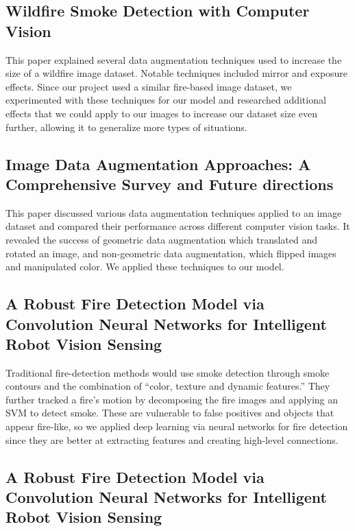 \subsection{Wildfire Smoke Detection with Computer Vision
	~\citep{Daniel}}

This paper explained several data augmentation techniques used to increase the size of a wildfire image dataset. Notable techniques included mirror and exposure effects. Since our project used a similar fire-based image dataset, we experimented with these techniques for our model and researched additional effects that we could apply to our images to increase our dataset size even further, allowing it to generalize more types of situations.

\subsection{Image Data Augmentation Approaches: A Comprehensive Survey and Future directions~\citep{kumar2023image}}

This paper discussed various data augmentation techniques applied to an image dataset and compared their performance across different computer vision tasks. It revealed the success of geometric data augmentation which translated and rotated an image, and non-geometric data augmentation, which flipped images and manipulated color. We applied these techniques to our model.

\subsection{A Robust Fire Detection Model via Convolution Neural Networks for Intelligent Robot Vision Sensing~\citep{s22082929}}

Traditional fire-detection methods would use smoke detection through smoke contours and the combination of ``color, texture and dynamic features.'' They further tracked a fire's motion by decomposing the fire images and applying an SVM to detect smoke.
These are vulnerable to false positives and objects that appear fire-like, so we applied deep learning via neural networks for fire detection since they are better at extracting features and creating high-level connections.

\subsection{A Robust Fire Detection Model via Convolution Neural Networks for Intelligent Robot Vision Sensing~\citep{howard2017mobilenets}}

